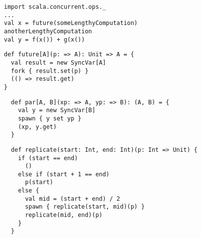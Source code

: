 \begin{lstlisting}
import scala.concurrent.ops._
...
val x = future(someLengthyComputation)
anotherLengthyComputation
val y = f(x()) + g(x())
\end{lstlisting}

\begin{lstlisting}
def future[A](p: => A): Unit => A = {
  val result = new SyncVar[A]
  fork { result.set(p) }
  (() => result.get)
}
\end{lstlisting}




\begin{lstlisting}
  def par[A, B](xp: => A, yp: => B): (A, B) = {
    val y = new SyncVar[B]
    spawn { y set yp }
    (xp, y.get)
  }
\end{lstlisting}
\begin{lstlisting}
  def replicate(start: Int, end: Int)(p: Int => Unit) {
    if (start == end)
      ()
    else if (start + 1 == end)
      p(start)
    else {
      val mid = (start + end) / 2
      spawn { replicate(start, mid)(p) }
      replicate(mid, end)(p)
    }
  }
\end{lstlisting}

